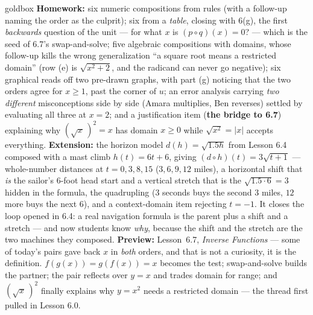 \documentclass[10pt]{article}
\begin{document}
\begin{skillbox}{goldbox}
\textbf{Homework:} six numeric compositions from rules (with a follow-up naming the order as the
culprit); six from a \emph{table}, closing with 6(g), the first \emph{backwards} question of the
unit --- for what $x$ is $(p\circ q)(x)=0$? --- which is the seed of 6.7's swap-and-solve; five
algebraic compositions with domains, whose follow-up kills the wrong generalization ``a square root
means a restricted domain'' (row (e) is $\sqrt{x^{2}+2}$, and the radicand can never go negative);
six graphical reads off two pre-drawn graphs, with part (g) noticing that the two orders agree for
$x\ge1$, past the corner of $u$; an error analysis carrying \emph{two different} misconceptions
side by side (Amara multiplies, Ben reverses) settled by evaluating all three at $x=2$; and a
justification item (\textbf{the bridge to 6.7}) explaining why $\left(\sqrt{x}\,\right)^{2}=x$ has
domain $x\ge0$ while $\sqrt{x^{2}}=|x|$ accepts everything. \textbf{Extension:} the horizon model
$d(h)=\sqrt{1.5h}$ from Lesson 6.4 composed with a mast climb $h(t)=6t+6$, giving
$(d\circ h)(t)=3\sqrt{t+1}$ --- whole-number distances at $t=0,3,8,15$ ($3,6,9,12$ miles), a
horizontal shift that \emph{is} the sailor's $6$-foot head start and a vertical stretch that is the
$\sqrt{1.5\cdot6}=3$ hidden in the formula, the quadrupling ($3$ seconds buys the second $3$ miles,
$12$ more buys the next $6$), and a context-domain item rejecting $t=-1$. It closes the loop opened
in 6.4: a real navigation formula is the parent plus a shift and a stretch --- and now students know
\emph{why}, because the shift and the stretch are the two machines they composed.
\textbf{Preview:} Lesson~6.7, \emph{Inverse Functions} --- some of today's pairs gave back $x$ in
\emph{both} orders, and that is not a curiosity, it is the definition. $f(g(x))=g(f(x))=x$ becomes
the test; swap-and-solve builds the partner; the pair reflects over $y=x$ and trades domain for
range; and $\left(\sqrt{x}\,\right)^{2}$ finally explains why $y=x^{2}$ needs a restricted domain ---
the thread first pulled in Lesson 6.0.
\end{skillbox}
\end{document}

